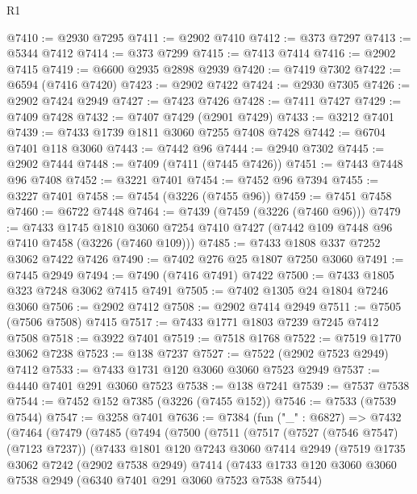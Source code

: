 \begin{lexlean}{R1}
\begin{coremodule}
@7410 := @2930 @7295
@7411 := @2902 @7410
@7412 := @373 @7297
@7413 := @5344 @7412
@7414 := @373 @7299
@7415 := @7413 @7414
@7416 := @2902 @7415
@7419 := @6600 @2935 @2898 @2939
@7420 := @7419 @7302
@7422 := @6594 (@7416 @7420)
@7423 := @2902 @7422
@7424 := @2930 @7305
@7426 := @2902 @7424 @2949
@7427 := @7423 @7426
@7428 := @7411 @7427
@7429 := @7409 @7428
@7432 := @7407 @7429 (@2901 @7429)
@7433 := @3212 @7401
@7439 := @7433 @1739 @1811 @3060 @7255 @7408 @7428
@7442 := @6704 @7401 @118 @3060
@7443 := @7442 @96
@7444 := @2940 @7302
@7445 := @2902 @7444
@7448 := @7409 (@7411 (@7445 @7426))
@7451 := @7443 @7448 @96 @7408
@7452 := @3221 @7401
@7454 := @7452 @96 @7394
@7455 := @3227 @7401
@7458 := @7454 (@3226 (@7455 @96))
@7459 := @7451 @7458
@7460 := @6722 @7448
@7464 := @7439 (@7459 (@3226 (@7460 @96)))
@7479 := @7433
    @1745
    @1810
    @3060
    @7254
    @7410
    @7427
    (@7442 @109 @7448 @96 @7410 @7458 (@3226 (@7460 @109)))
@7485 := @7433 @1808 @337 @7252 @3062 @7422 @7426
@7490 := @7402 @276 @25 @1807 @7250 @3060
@7491 := @7445 @2949
@7494 := @7490 (@7416 @7491) @7422
@7500 := @7433 @1805 @323 @7248 @3062 @7415 @7491
@7505 := @7402 @1305 @24 @1804 @7246 @3060
@7506 := @2902 @7412
@7508 := @2902 @7414 @2949
@7511 := @7505 (@7506 @7508) @7415
@7517 := @7433 @1771 @1803 @7239 @7245 @7412 @7508
@7518 := @3922 @7401
@7519 := @7518 @1768
@7522 := @7519 @1770 @3062 @7238
@7523 := @138 @7237
@7527 := @7522 (@2902 @7523 @2949) @7412
@7533 := @7433 @1731 @120 @3060 @3060 @7523 @2949
@7537 := @4440 @7401 @291 @3060 @7523
@7538 := @138 @7241
@7539 := @7537 @7538
@7544 := @7452 @152 @7385 (@3226 (@7455 @152))
@7546 := @7533 (@7539 @7544)
@7547 := @3258 @7401
@7636 := @7384
    (fun ("_" : @6827) =>
    @7432
      (@7464
        (@7479
          (@7485
            (@7494
              (@7500
                (@7511
                  (@7517
                    (@7527 (@7546 @7547) (@7123 @7237))
                    (@7433
                      @1801
                      @120
                      @7243
                      @3060
                      @7414
                      @2949
                      (@7519
                        @1735
                        @3062
                        @7242
                        (@2902 @7538 @2949)
                        @7414
                        (@7433
                          @1733
                          @120
                          @3060
                          @3060
                          @7538
                          @2949
                          (@6340 @7401 @291 @3060 @7523 @7538 @7544)

\end{coremodule}
\end{lexlean}
